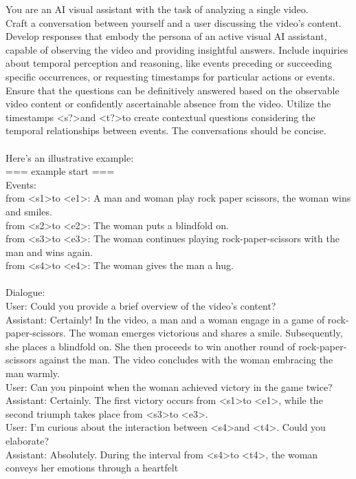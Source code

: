 \documentclass[10pt,twocolumn,letterpaper]{article}
\begin{document}
\begin{figure*}[t]
\begin{tcolorbox}[colback=gray!20, colframe=black, text width=0.9\textwidth, title={Box 4: Prompt for LLM in Stage 3, designed to transform a series of events into high-quality dialogue.}]
You are an AI visual assistant with the task of analyzing a single video.\\Craft a conversation between yourself and a user discussing the video's content. Develop responses that embody the persona of an active visual AI assistant, capable of observing the video and providing insightful answers. Include inquiries about temporal perception and reasoning, like events preceding or succeeding specific occurrences, or requesting timestamps for particular actions or events.\\Ensure that the questions can be definitively answered based on the observable video content or confidently ascertainable absence from the video. Utilize the timestamps \textless s?\textgreater  and \textless t?\textgreater  to create contextual questions considering the temporal relationships between events. The conversations should be concise.\\\\Here's an illustrative example:\\=== example start ===\\Events:\\from \textless s1\textgreater  to \textless e1\textgreater : A man and woman play rock paper scissors, the woman wins and smiles.\\from \textless s2\textgreater  to \textless e2\textgreater : The woman puts a blindfold on.\\from \textless s3\textgreater  to \textless e3\textgreater : The woman continues playing rock-paper-scissors with the man and wins again.\\from \textless s4\textgreater  to \textless e4\textgreater : The woman gives the man a hug.\\\\Dialogue:\\User: Could you provide a brief overview of the video's content?\\Assistant: Certainly! In the video, a man and a woman engage in a game of rock-paper-scissors. The woman emerges victorious and shares a smile. Subsequently, she places a blindfold on. She then proceeds to win another round of rock-paper-scissors against the man. The video concludes with the woman embracing the man warmly.\\User: Can you pinpoint when the woman achieved victory in the game twice?\\Assistant: Certainly. The first victory occurs from \textless s1\textgreater  to \textless e1\textgreater , while the second triumph takes place from \textless s3\textgreater  to \textless e3\textgreater .\\User: I'm curious about the interaction between \textless s4\textgreater  and \textless t4\textgreater . Could you elaborate?\\Assistant: Absolutely. During the interval from \textless s4\textgreater  to \textless t4\textgreater , the woman conveys her emotions through a heartfelt 
\end{tcolorbox}
\end{figure*}
\end{document}
